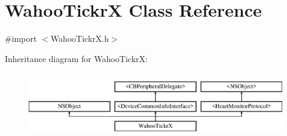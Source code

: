 \hypertarget{interface_wahoo_tickr_x}{\section{Wahoo\-Tickr\-X Class Reference}
\label{interface_wahoo_tickr_x}
}


{\ttfamily \#import $<$Wahoo\-Tickr\-X.\-h$>$}

Inheritance diagram for Wahoo\-Tickr\-X\-:\begin{figure}[H]
\begin{center}
\leavevmode
\includegraphics[height=2.901554cm]{interface_wahoo_tickr_x}
\end{center}
\end{figure}
